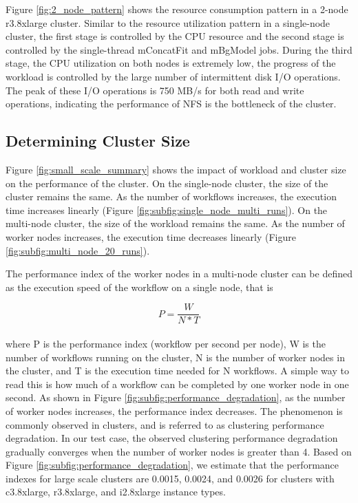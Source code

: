 Figure \ref{fig:2_node_pattern} shows the resource consumption pattern in a 2-node r3.8xlarge cluster. Similar to the resource utilization pattern in a single-node cluster, the first stage is controlled by the CPU resource and the second stage is controlled by the single-thread mConcatFit and mBgModel jobs. During the third stage, the CPU utilization on both nodes is extremely low, the progress of the workload is controlled by the large number of intermittent disk I/O operations. The peak of these I/O operations is 750 MB/s for both read and write operations, indicating the performance of NFS is the bottleneck of the cluster.  


\subsection{Determining Cluster Size}
\label{sec:subsec:Performance index}

Figure \ref{fig:small_scale_summary} shows the impact of workload and cluster size on the performance of the cluster. On the single-node cluster, the size of the cluster remains the same. As the number of workflows increases, the execution time increases linearly (Figure \ref{fig:subfig:single_node_multi_runs}). On the multi-node cluster, the size of the workload remains the same. As the number of worker nodes increases, the execution time decreases linearly (Figure \ref{fig:subfig:multi_node_20_runs}). 

The performance index of the worker nodes in a multi-node cluster can be defined as the execution speed of the workflow on a single node, that is

\begin{equation}
P =\frac{W}{N * T}
\label{eq:performance_index} 
\end{equation}
\\
where P is the performance index (workflow per second per node), W is the number of workflows running on the cluster, N is the number of worker nodes in the cluster, and T is the execution time needed for N workflows. A simple way to read this is how much of a workflow can be completed by one worker node in one second. As shown in Figure \ref{fig:subfig:performance_degradation}, as the number of worker nodes increases, the performance index decreases. The phenomenon is commonly observed in clusters, and is referred to as clustering performance degradation. In our test case, the observed clustering performance degradation gradually converges when the number of worker nodes is greater than 4. Based on Figure \ref{fig:subfig:performance_degradation}, we estimate that the performance indexes for large scale clusters are 0.0015, 0.0024, and 0.0026 for clusters with c3.8xlarge, r3.8xlarge, and i2.8xlarge instance types.

